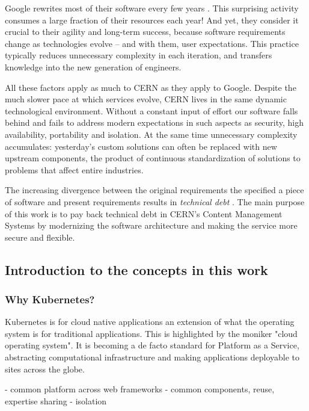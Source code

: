 Google rewrites most of their software every few years \cite{henderson_software_2020}.
This surprising activity consumes a large fraction of their resources each year!
And yet, they consider it crucial to their agility and long-term success, because software requirements change as technologies evolve -- and with them, user expectations.
This practice typically reduces unnecessary complexity in each iteration,
and transfers knowledge into the new generation of engineers.

All these factors apply as much to CERN as they apply to Google.
Despite the much slower pace at which services evolve, CERN lives in the same dynamic technological environment.
Without a constant input of effort our software falls behind and fails to address modern expectations
in such aspects as security, high availability, portability and isolation.
At the same time unnecessary complexity accumulates:
yesterday's custom solutions can often be replaced with new upstream components,
the product of continuous standardization of solutions to problems that affect entire industries.

The increasing divergence between the original requirements the specified a piece of software and present requirements
results in \emph{technical debt} \cite{fairbanks_ur-technical_2020}.
The main purpose of this work is to pay back technical debt in CERN's Content Management Systems by modernizing the software architecture
and making the service more secure and flexible.


\subsection{Introduction to the concepts in this work}

\subsubsection*{Why Kubernetes?}

Kubernetes is for cloud native applications an extension of what the operating system is for traditional applications.
This is highlighted by the moniker "cloud operating system".
It is becoming a de facto standard for Platform as a Service, abstracting computational infrastructure and making applications deployable to sites across the globe.



- common platform across web frameworks
- common components, reuse, expertise sharing
- isolation

